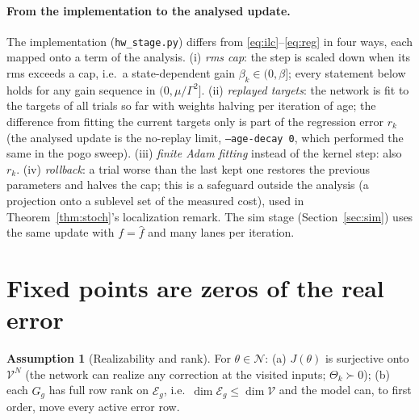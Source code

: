 \documentclass[11pt]{article}
\theoremstyle{definition}
\newtheorem{assumption}{Assumption}
\theoremstyle{remark}
\newcommand{\cV}{\mathcal{V}}
\newcommand{\cE}{\mathcal{E}}
\newcommand{\cN}{\mathcal{N}}
\newcommand{\Ghat}{\widehat G}
\newcommand{\fhat}{\widehat f}
\begin{document}
\paragraph{From the implementation to the analysed update.} The implementation (\texttt{hw\_stage.py}) differs from
\eqref{eq:ilc}--\eqref{eq:reg} in four ways, each mapped onto a term of the analysis.
(i) \emph{rms cap}: the step is scaled down when its rms exceeds a cap, i.e.\ a state-dependent gain
$\beta_k\in(0,\beta]$; every statement below holds for any gain sequence in $(0,\mu/\Gamma^2]$.
(ii) \emph{replayed targets}: the network is fit to the targets of all trials so far with weights halving per iteration
of age; the difference from fitting the current targets only is part of the regression error $r_k$ (the analysed
update is the no-replay limit, \texttt{--age-decay 0}, which performed the same in the pogo sweep).
(iii) \emph{finite Adam fitting} instead of the kernel step: also $r_k$.
(iv) \emph{rollback}: a trial worse than the last kept one restores the previous parameters and halves the cap; this
is a safeguard outside the analysis (a projection onto a sublevel set of the measured cost), used in
Theorem~\ref{thm:stoch}'s localization remark.
The sim stage (Section~\ref{sec:sim}) uses the same update with $f=\fhat$ and many lanes per iteration.

\section{Fixed points are zeros of the real error}

\begin{assumption}[Realizability and rank]\label{as:rank}
For $\theta\in\cN$: (a) $J(\theta)$ is surjective onto $\cV^N$ (the network can realize any correction at the visited
inputs; $\Theta_k\succ0$); (b) each $\Ghat_g$ has full row rank on $\cE_g$, i.e.\ $\dim\cE_g\le\dim\cV$ and the
model can, to first order, move every active error row.
\end{assumption}
\end{document}
